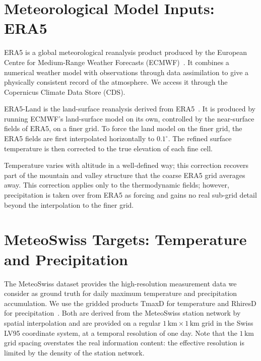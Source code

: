 \section{Meteorological Model Inputs: ERA5}\label{sec:data-era5}

ERA5 is a global meteorological reanalysis product produced by the European Centre for Medium-Range Weather Forecasts (ECMWF)~\cite{hersbach2020era5}. It combines a numerical weather model with observations through data assimilation to give a physically consistent record of the atmosphere. We access it through the Copernicus Climate Data Store (CDS).

ERA5-Land is the land-surface reanalysis derived from ERA5~\cite{munozsabater2021era5land, era5land_daily}. It is produced by running ECMWF's land-surface model on its own, controlled by the near-surface fields of ERA5, on a finer grid. To force the land model on the finer grid, the ERA5 fields are first interpolated horizontally to $0.1^{\circ}$.  The refined surface temperature is then corrected to the true elevation of each fine cell.

Temperature varies with altitude in a well-defined way; this correction recovers part of the mountain and valley structure that the coarse ERA5 grid averages away. This correction applies only to the thermodynamic fields; however, precipitation is taken over from ERA5 as forcing and gains no real sub-grid detail beyond the interpolation to the finer grid.

\section{MeteoSwiss Targets: Temperature and Precipitation}\label{sec:data-targets}

The MeteoSwiss dataset provides the high-resolution measurement data we consider as ground truth for daily maximum temperature and precipitation accumulation. We use the gridded products TmaxD for temperature and RhiresD for precipitation~\cite{meteoswiss_ogd_grid}. Both are derived from the MeteoSwiss station network by spatial interpolation \cite{frei2014temperature,frei1998precip} and are provided on a regular $1\,\mathrm{km} \times 1\,\mathrm{km}$ grid in the Swiss LV95 coordinate system, at a temporal resolution of one day. Note that the $1\,\mathrm{km}$ grid spacing overstates the real information content: the effective resolution is limited by the density of the station network.

